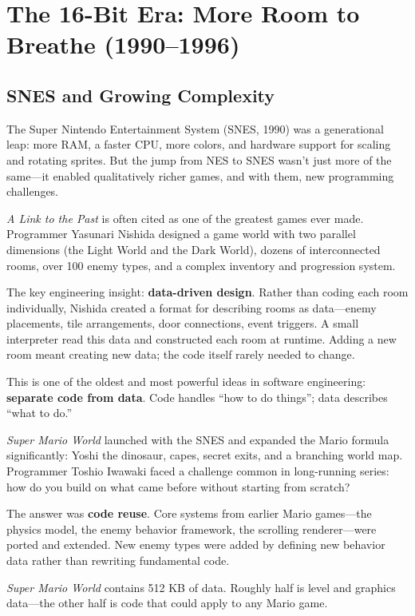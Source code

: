 \documentclass[11pt,letterpaper]{article}
\begin{document}
\section{The 16-Bit Era: More Room to Breathe (1990--1996)}

\subsection{SNES and Growing Complexity}

The Super Nintendo Entertainment System (SNES, 1990) was a generational leap: more RAM, a faster CPU, more colors, and hardware support for scaling and rotating sprites. But the jump from NES to SNES wasn't just more of the same---it enabled qualitatively richer games, and with them, new programming challenges.

\begin{historybox}
\textit{A Link to the Past} is often cited as one of the greatest games ever made. Programmer Yasunari Nishida designed a game world with two parallel dimensions (the Light World and the Dark World), dozens of interconnected rooms, over 100 enemy types, and a complex inventory and progression system.

The key engineering insight: \textbf{data-driven design}. Rather than coding each room individually, Nishida created a format for describing rooms as data---enemy placements, tile arrangements, door connections, event triggers. A small interpreter read this data and constructed each room at runtime. Adding a new room meant creating new data; the code itself rarely needed to change.

This is one of the oldest and most powerful ideas in software engineering: \textbf{separate code from data}. Code handles ``how to do things''; data describes ``what to do.''
\end{historybox}

\begin{historybox}
\textit{Super Mario World} launched with the SNES and expanded the Mario formula significantly: Yoshi the dinosaur, capes, secret exits, and a branching world map. Programmer Toshio Iwawaki faced a challenge common in long-running series: how do you build on what came before without starting from scratch?

The answer was \textbf{code reuse}. Core systems from earlier Mario games---the physics model, the enemy behavior framework, the scrolling renderer---were ported and extended. New enemy types were added by defining new behavior data rather than rewriting fundamental code.

\textit{Super Mario World} contains 512 KB of data. Roughly half is level and graphics data---the other half is code that could apply to any Mario game.
\end{historybox}
\end{document}
